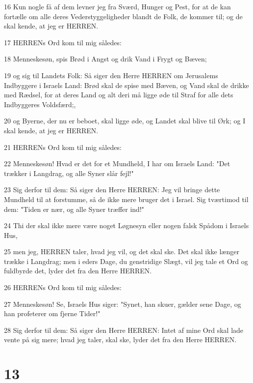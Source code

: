 \par 16 Kun nogle få af dem levner jeg fra Sværd, Hunger og Pest, for at de kan fortælle om alle deres Vederstyggeligheder blandt de Folk, de kommer til; og de skal kende, at jeg er HERREN.
\par 17 HERRENs Ord kom til mig således:
\par 18 Menneskesøn, spis Brød i Angst og drik Vand i Frygt og Bæven;
\par 19 og sig til Landets Folk: Så siger den Herre HERREN om Jerusalems Indbyggere i Israels Land: Brød skal de spise med Bæven, og Vand skal de drikke med Rædsel, for at deres Land og alt deri må ligge øde til Straf for alle dets Indbyggeres Voldsfærd;,
\par 20 og Byerne, der nu er beboet, skal ligge øde, og Landet skal blive til Ørk; og I skal kende, at jeg er HERREN.
\par 21 HERRENs Ord kom til mig således:
\par 22 Menneskesøn! Hvad er det for et Mundheld, I har om Israels Land: "Det trækker i Langdrag, og alle Syner slår fejl!"
\par 23 Sig derfor til dem: Så siger den Herre HERREN: Jeg vil bringe dette Mundheld til at forstumme, så de ikke mere bruger det i Israel. Sig tværtimod til dem: "Tiden er nær, og alle Syner træffer ind!"
\par 24 Thi der skal ikke mere være noget Løgnesyn eller nogen falsk Spådom i Israels Hus,
\par 25 men jeg, HERREN taler, hvad jeg vil, og det skal ske. Det skal ikke længer trække i Langdrag; men i eders Dage, du genstridige Slægt, vil jeg tale et Ord og fuldbyrde det, lyder det fra den Herre HERREN.
\par 26 HERRENs Ord kom til mig således:
\par 27 Menneskesøn! Se, Israels Hus siger: "Synet, han skuer, gælder sene Dage, og han profeterer om fjerne Tider!"
\par 28 Sig derfor til dem: Så siger den Herre HERREN: Intet af mine Ord skal lade vente på sig mere; hvad jeg taler, skal ske, lyder det fra den Herre HERREN.

\chapter{13}

